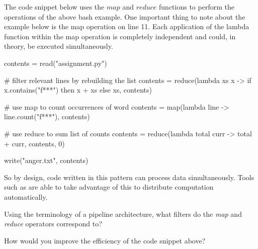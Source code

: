 \documentclass{csse4400}
\begin{document}
The code snippet below uses the $map$ and $reduce$ functions
to perform the operations of the above bash example.
One important thing to note about the example below is the map operation on line 11.
Each application of the lambda function within the map operation is completely independent and could,
in theory, be executed simultaneously. 

\begin{code}[language=python,literate={{->}{{$\to$}}{2}{lambda}{{$\lambda$}}{1}},morekeywords={then}]{}
contents = read("assignment.py")

# filter relevant lines by rebuilding the list
contents = reduce(lambda xs x -> 
                    if x.contains("f***")
                        then x + xs
                        else xs,
                  contents)

# use map to count occurrences of word
contents = map(lambda line -> line.count("f***"), contents)

# use reduce to sum list of counts
contents = reduce(lambda total curr -> total + curr, contents, 0)

write("anger.txt", contents)
\end{code}

So by design, code written in this pattern can process data simultaneously.
Tools such as  are able to take advantage of this to distribute computation automatically.

\begin{extra}
Using the terminology of a pipeline architecture, what filters do the \textsl{map} and \textsl{reduce} operators correspond to?
\end{extra}

\begin{extra}
How would you improve the efficiency of the code snippet above?
\end{extra}



\end{document}
